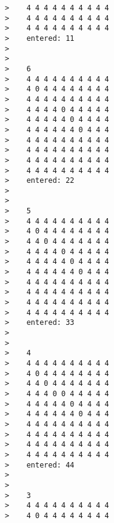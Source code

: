 \documentclass[12pt]{book}
\begin{document}
\begin{lstlisting}
                               >    4 4 4 4 4 4 4 4 4 4 
                               >    4 4 4 4 4 4 4 4 4 4 
                               >    4 4 4 4 4 4 4 4 4 4 
                               >    entered: 11
                               >
                               >
                               >    6 
                               >    4 4 4 4 4 4 4 4 4 4 
                               >    4 0 4 4 4 4 4 4 4 4 
                               >    4 4 4 4 4 4 4 4 4 4 
                               >    4 4 4 4 0 4 4 4 4 4 
                               >    4 4 4 4 4 0 4 4 4 4 
                               >    4 4 4 4 4 4 0 4 4 4 
                               >    4 4 4 4 4 4 4 4 4 4 
                               >    4 4 4 4 4 4 4 4 4 4 
                               >    4 4 4 4 4 4 4 4 4 4 
                               >    4 4 4 4 4 4 4 4 4 4 
                               >    entered: 22
                               >
                               >
                               >    5 
                               >    4 4 4 4 4 4 4 4 4 4 
                               >    4 0 4 4 4 4 4 4 4 4 
                               >    4 4 0 4 4 4 4 4 4 4 
                               >    4 4 4 4 0 4 4 4 4 4 
                               >    4 4 4 4 4 0 4 4 4 4 
                               >    4 4 4 4 4 4 0 4 4 4 
                               >    4 4 4 4 4 4 4 4 4 4 
                               >    4 4 4 4 4 4 4 4 4 4 
                               >    4 4 4 4 4 4 4 4 4 4 
                               >    4 4 4 4 4 4 4 4 4 4 
                               >    entered: 33
                               >
                               >
                               >    4 
                               >    4 4 4 4 4 4 4 4 4 4 
                               >    4 0 4 4 4 4 4 4 4 4 
                               >    4 4 0 4 4 4 4 4 4 4 
                               >    4 4 4 0 0 4 4 4 4 4 
                               >    4 4 4 4 4 0 4 4 4 4 
                               >    4 4 4 4 4 4 0 4 4 4 
                               >    4 4 4 4 4 4 4 4 4 4 
                               >    4 4 4 4 4 4 4 4 4 4 
                               >    4 4 4 4 4 4 4 4 4 4 
                               >    4 4 4 4 4 4 4 4 4 4 
                               >    entered: 44
                               >
                               >
                               >    3 
                               >    4 4 4 4 4 4 4 4 4 4 
                               >    4 0 4 4 4 4 4 4 4 4 

\end{lstlisting}
\end{document}
